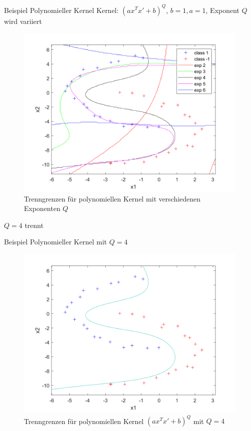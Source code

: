 \documentclass[ngerman]{beamer}
\begin{document}
\begin{frame}{Beispiel Polynomieller Kernel}
    Kernel: $(a x^{T}x' + b)^{Q}$, $b = 1, a = 1$, Exponent $Q$ wird variiert \\ \pause
    \begin{center}
        \begin{figure}
            \includegraphics[width=\textwidth,height=0.7\textheight,keepaspectratio]{../code/octave/images/kernelexptest}
            \caption{Trenngrenzen für polynomiellen Kernel mit verschiedenen Exponenten $Q$}
            \label{fig:bsppolykern}
        \end{figure}
    \end{center} \pause
    $Q = 4$ trennt
\end{frame}

\begin{frame}{Beispiel Polynomieller Kernel mit $Q=4$}
    \begin{center}
        \begin{figure}
            \includegraphics[width=\textwidth,height=0.7\textheight,keepaspectratio]{../code/octave/images/sgddatasetkernelsolve}
            \caption{Trenngrenzen für polynomiellen Kernel $(a x^{T}x' + b)^{Q}$ mit $Q=4$}
            \label{fig:bsppolykernqfour}
        \end{figure}
    \end{center}
\end{frame}
\end{document}
